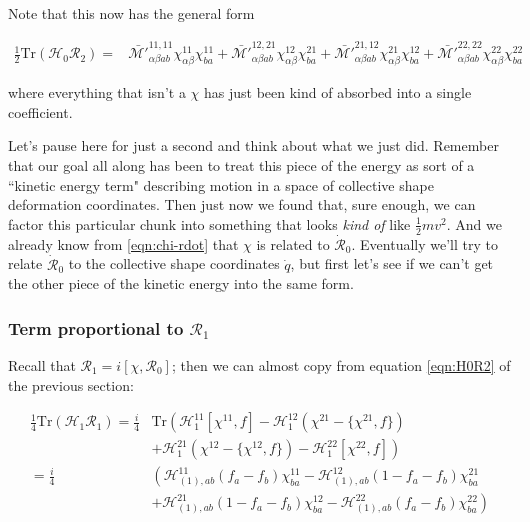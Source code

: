 \noindent Note that this now has the general form

\begin{tcolorbox}
\begin{align}\label{eqn:H0R2_inertia}
\frac{1}{2}\mathrm{Tr}\left(\mathcal{H}_0\mathcal{R}_2\right) = &
 \mathcal{\bar{M'}}^{11,11}_{\alpha\beta ab}\chi^{11}_{\alpha\beta}\chi^{11}_{ba} +
 \mathcal{\bar{M'}}^{12,21}_{\alpha\beta ab}\chi^{12}_{\alpha\beta}\chi^{21}_{ba} +
 \mathcal{\bar{M'}}^{21,12}_{\alpha\beta ab}\chi^{21}_{\alpha\beta}\chi^{12}_{ba} +
 \mathcal{\bar{M'}}^{22,22}_{\alpha\beta ab}\chi^{22}_{\alpha\beta}\chi^{22}_{ba}
\end{align}
\end{tcolorbox}

\noindent where everything that isn't a $\chi$ has just been kind of absorbed into a single coefficient.

Let's pause here for just a second and think about what we just did. Remember that our goal all along has been to treat this piece of the energy as sort of a ``kinetic energy term" describing motion in a space of collective shape deformation coordinates. Then just now we found that, sure enough, we can factor this particular chunk into something that looks \textit{kind of} like $\frac{1}{2}mv^2$. And we already know from \ref{eqn:chi-rdot} that $\chi$ is related to $\mathcal{\dot{R}}_0$. Eventually we'll try to relate $\mathcal{\dot{R}}_0$ to the collective shape coordinates $\dot{q}$, but first let's see if we can't get the other piece of the kinetic energy into the same form.

\subsubsection{Term proportional to $\mathcal{R}_1$}

Recall that $\mathcal{R}_1 = i\left[\chi, \mathcal{R}_0\right]$; then we can almost copy from equation \ref{eqn:H0R2} of the previous section:

\begin{align}\label{eqn:H1R1}
\frac{1}{4}\mathrm{Tr}\left(\mathcal{H}_{1}\mathcal{R}_{1}\right) = \frac{i}{4}&\mathrm{Tr} \left(\mathcal{H}_{1}^{11}[\chi^{11},f] - \mathcal{H}_{1}^{12}(\chi^{21}-\{\chi^{21},f\}) \right. \nonumber\\
&\left.+ \mathcal{H}_{1}^{21}(\chi^{12}-\{\chi^{12},f\}) - \mathcal{H}_{1}^{22}[\chi^{22},f]\right) \nonumber\\
= \frac{i}{4}& \left(\mathcal{H}_{(1),ab}^{11}(f_a-f_b)\chi^{11}_{ba} - \mathcal{H}_{(1),ab}^{12}(1-f_a-f_b)\chi^{21}_{ba} \right. \nonumber\\
&\left.+ \mathcal{H}_{(1),ab}^{21}(1-f_a-f_b)\chi^{12}_{ba} - \mathcal{H}_{(1),ab}^{22}(f_a-f_b)\chi^{22}_{ba}\right)
\end{align}


